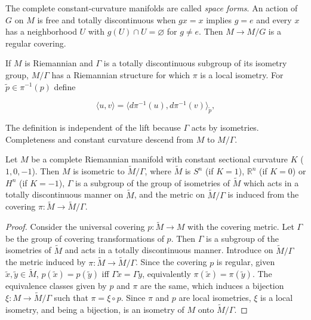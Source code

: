 The complete constant-curvature manifolds are called \emph{space forms}. An action
of $G$ on $M$ is free and totally discontinuous when $gx=x$ implies $g=e$ and every
$x$ has a neighborhood $U$ with $g(U)\cap U=\varnothing$ for $g\ne e$. Then
$M\to M/G$ is a regular covering.

If $M$ is Riemannian and $\Gamma$ is a totally discontinuous subgroup of its
isometry group, $M/\Gamma$ has a Riemannian structure for which $\pi$ is a local
isometry. For $\tilde p\in\pi^{-1}(p)$ define

$$
\langle u,v\rangle=\langle d\pi^{-1}(u),d\pi^{-1}(v)\rangle_{\tilde{p}},
$$

The definition is independent of the lift because $\Gamma$ acts by isometries.
Completeness and constant curvature descend from $M$ to $M/\Gamma$.

\begin{proposition}
  \label{prop:dc-ch8-4-3}


  Let $M$ be a complete Riemannian manifold with constant sectional curvature $K$
  ($1,0,-1$). Then $M$ is isometric to $\tilde{M}/\Gamma$, where $\tilde{M}$ is $S^n$
  (if $K=1$), $\mathbb{R}^n$ (if $K=0$) or $H^n$ (if $K=-1$), $\Gamma$ is a subgroup
  of the group of isometries of $\tilde{M}$ which acts in a totally discontinuous
  manner on $\tilde{M}$, and the metric on $\tilde{M}/\Gamma$ is induced from the
  covering $\pi:\tilde{M}\to\tilde{M}/\Gamma$.
\end{proposition}
\begin{proof}
\sketch
  Consider the universal covering $p:\tilde{M}\to M$ with the covering
  metric. Let $\Gamma$ be the group of covering transformations of $p$. Then
  $\Gamma$ is a subgroup of the isometries of $\tilde{M}$ and acts in a totally
  discontinuous manner. Introduce on $\tilde{M}/\Gamma$ the metric induced by
  $\pi:\tilde{M}\to\tilde{M}/\Gamma$. Since the covering $p$ is regular, given
  $\tilde{x},\tilde{y}\in\tilde{M}$, $p(\tilde{x})=p(\tilde{y})$ iff
  $\Gamma\tilde{x}=\Gamma\tilde{y}$, equivalently $\pi(\tilde{x})=\pi(\tilde{y})$.
  The equivalence classes given by $p$ and $\pi$ are the same, which induces a
  bijection $\xi:M\to\tilde{M}/\Gamma$ such that $\pi=\xi\circ p$. Since $\pi$ and
  $p$ are local isometries, $\xi$ is a local isometry, and being a bijection, is an
  isometry of $M$ onto $\tilde{M}/\Gamma$.
\end{proof}

